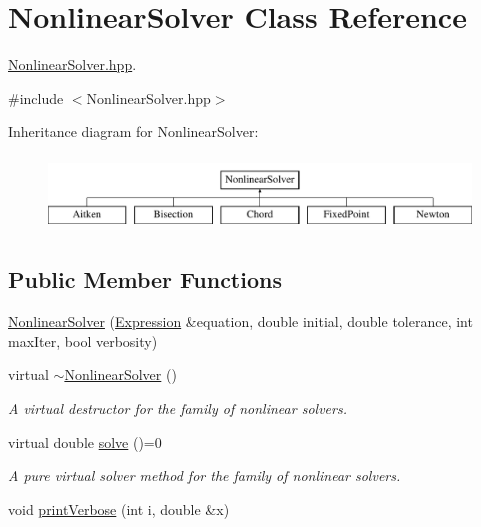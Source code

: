 \hypertarget{class_nonlinear_solver}{}\section{Nonlinear\+Solver Class Reference}
\label{class_nonlinear_solver}


\hyperlink{_nonlinear_solver_8hpp_source}{Nonlinear\+Solver.\+hpp}.  




{\ttfamily \#include $<$Nonlinear\+Solver.\+hpp$>$}

Inheritance diagram for Nonlinear\+Solver\+:\begin{figure}[H]
\begin{center}
\leavevmode
\includegraphics[height=2.000000cm]{class_nonlinear_solver}
\end{center}
\end{figure}
\subsection*{Public Member Functions}
\begin{DoxyCompactItemize}
\item 
\hyperlink{class_nonlinear_solver_af47ece967a93e6cfaf5b46bff22f6279}{Nonlinear\+Solver} (\hyperlink{class_expression}{Expression} \&equation, double initial, double tolerance, int max\+Iter, bool verbosity)
\item 
virtual \hyperlink{class_nonlinear_solver_ad29eabca357434c5e40764a80ee8482f}{$\sim$\+Nonlinear\+Solver} ()\hypertarget{class_nonlinear_solver_ad29eabca357434c5e40764a80ee8482f}{}\label{class_nonlinear_solver_ad29eabca357434c5e40764a80ee8482f}

\begin{DoxyCompactList}\small\item\em A virtual destructor for the family of nonlinear solvers. \end{DoxyCompactList}\item 
virtual double \hyperlink{class_nonlinear_solver_a72180277586bd7ec915cc4a806f62bb9}{solve} ()=0\hypertarget{class_nonlinear_solver_a72180277586bd7ec915cc4a806f62bb9}{}\label{class_nonlinear_solver_a72180277586bd7ec915cc4a806f62bb9}

\begin{DoxyCompactList}\small\item\em A pure virtual solver method for the family of nonlinear solvers. \end{DoxyCompactList}\item 
void \hyperlink{class_nonlinear_solver_ac27b68fb52e995ee5204b255460a3e13}{print\+Verbose} (int i, double \&x)
\end{DoxyCompactItemize}
